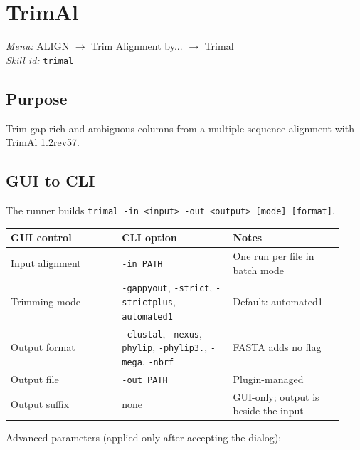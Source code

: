 \documentclass[11pt]{report}
\begin{document}
\section{TrimAl}
\noindent\textit{Menu:} ALIGN $\rightarrow$ Trim Alignment by... $\rightarrow$ Trimal\\
\noindent\textit{Skill id:} \texttt{trimal}

\subsection{Purpose}

Trim gap-rich and ambiguous columns from a multiple-sequence alignment with TrimAl 1.2rev57.

\subsection{GUI to CLI}

The runner builds \texttt{trimal -in <input> -out <output> [mode] [format]}.

{\footnotesize
\begin{longtable}{@{}>{\raggedright\arraybackslash}p{0.31\linewidth}>{\raggedright\arraybackslash}p{0.31\linewidth}>{\raggedright\arraybackslash}p{0.31\linewidth}@{}}
\toprule
GUI control & CLI option & Notes \\
\midrule
\endhead
Input alignment & \texttt{-in PATH} & One run per file in batch mode \\
Trimming mode & \texttt{-gappyout}, \texttt{-strict}, \texttt{-strictplus}, \texttt{-automated1} & Default: automated1 \\
Output format & \texttt{-clustal}, \texttt{-nexus}, \texttt{-phylip}, \texttt{-phylip3.\allowbreak 2}, \texttt{-mega}, \texttt{-nbrf} & FASTA adds no flag \\
Output file & \texttt{-out PATH} & Plugin-managed \\
Output suffix & none & GUI-only; output is beside the input \\
\bottomrule
\end{longtable}
}

Advanced parameters (applied only after accepting the dialog):
\end{document}
